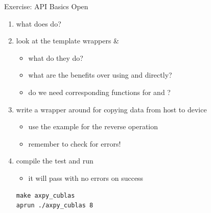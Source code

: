 \begin{frame}[fragile]{Exercise: API Basics}
    Open 
    \begin{enumerate}
        \item what does  do?
        \item look at the template wrappers  \& 
        \begin{itemize}
            \item what do they do?
            \item what are the benefits over using  and  directly?
            \item do we need corresponding functions for  and ?
        \end{itemize}

        \item write a wrapper around  for copying data from host to device
        \begin{itemize}
            \item use the example for the reverse operation 
            \item remember to check for errors!
        \end{itemize}

        \item compile the test and run
        \begin{itemize}
            \item it will pass with no errors on success
        \end{itemize}

    \vspace{-5pt}
\begin{lstlisting}[style=terminal]
make axpy_cublas
aprun ./axpy_cublas 8
\end{lstlisting}
    \end{enumerate}

\end{frame}


